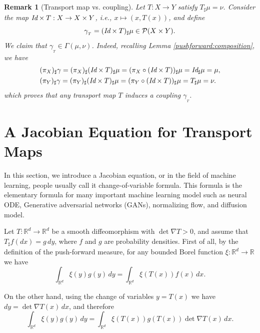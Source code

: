 \documentclass[11pt]{book}
\newtheorem{remark}[theorem]{Remark}
\begin{document}
\begin{remark}[Transport map vs. coupling] Let \(T: X \rightarrow Y\) satisfy \(T_\sharp \mu = \nu\). Consider the map \( \emph{Id} \times T: X \rightarrow X \times Y\), i.e., \(x \mapsto (x, T(x))\), and define
\[
\gamma_{_T} = (\emph{Id} \times T)_\sharp \mu \in \mathcal{P}(X \times Y).
\]
We claim that \(\gamma_{_T} \in \Gamma(\mu, \nu)\). Indeed, recalling Lemma \ref{pushforward:composition}, we have
\begin{align*}
&(\pi_X)_\sharp \gamma = (\pi_X)_\sharp(\emph{Id} \times T)_\sharp \mu = (\pi_X \circ (\emph{Id} \times T))_\sharp \mu = \emph{Id}_\sharp \mu = \mu, \\
&(\pi_Y)_\sharp \gamma = (\pi_Y)_\sharp(\emph{Id} \times T)_\sharp \mu = (\pi_Y \circ (\emph{Id} \times T))_\sharp \mu = T_\sharp \mu = \nu.
\end{align*}
which proves that any transport map \(T\) induces a coupling \(\gamma_{_T}\).
\end{remark}




\section[Jacobian]{A Jacobian Equation for Transport Maps}\label{section:Jacobian}


In this section, we introduce a Jacobian equation, or in the field of machine learning, people usually call it change-of-variable formula. This formula is the elementary formula for many important machine learning model such as neural ODE, Generative adversarial networks (GANs), normalizing flow, and diffusion model.

Let \( T: \mathbb{R}^d \rightarrow \mathbb{R}^d \) be a smooth diffeomorphism with \( \det \nabla T > 0 \), and assume that \( T_\sharp f (dx) = g \, dy \), where \( f \) and \( g \) are probability densities.
First of all, by the definition of the push-forward measure, for any bounded Borel function \( \xi: \mathbb{R}^d \rightarrow \mathbb{R} \) we have
\[
\int_{\mathbb{R}^d} \xi(y) g(y) \, dy = \int_{\mathbb{R}^d} \xi(T(x)) f(x) \, dx.
\]

On the other hand, using the change of variables \( y = T(x) \) we have \( dy = \det \nabla T(x) \, dx \), and therefore
\[
\int_{\mathbb{R}^d} \xi(y) g(y) \, dy = \int_{\mathbb{R}^d} \xi(T(x)) g(T(x)) \det \nabla T(x) \, dx.
\]
\end{document}
